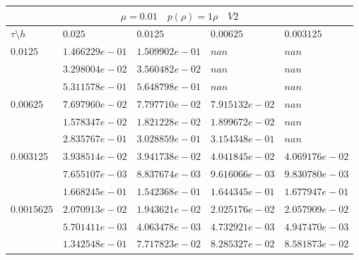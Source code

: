 \documentclass[a4paper,12pt]{extarticle}
\begin{document}
\begin{tabular}{|l|l|l|l|l|}
	\hline
	\multicolumn{5}{|c|}{$\mu =0.01 \quad  p(\rho) =1 \rho \quad V2$}\\
	\hline
	$\tau\setminus h$ & $0.025$ & $0.0125$ & $0.00625$ & $0.003125$\\
	\hline
	$0.0125$  & $1.466229e-01$ & $1.509902e-01$ & $nan$ & $nan$\\
	& $3.298004e-02$ & $3.560482e-02$ & $nan$ & $nan$\\
	& $5.311578e-01$ & $5.648798e-01$ & $nan$ & $nan$\\
	\hline
	$0.00625$  & $7.697960e-02$ & $7.797710e-02$ & $7.915132e-02$ & $nan$\\
	& $1.578347e-02$ & $1.821228e-02$ & $1.899672e-02$ & $nan$\\
	& $2.835767e-01$ & $3.028859e-01$ & $3.154348e-01$ & $nan$\\
	\hline
	$0.003125$  & $3.938514e-02$ & $3.941738e-02$ & $4.041845e-02$ & $4.069176e-02$\\
	& $7.655107e-03$ & $8.837674e-03$ & $9.616066e-03$ & $9.830780e-03$\\
	& $1.668245e-01$ & $1.542368e-01$ & $1.644345e-01$ & $1.677947e-01$\\
	\hline
	$0.0015625$  & $2.070913e-02$ & $1.943621e-02$ & $2.025176e-02$ & $2.057909e-02$\\
	& $5.701411e-03$ & $4.063478e-03$ & $4.732921e-03$ & $4.947470e-03$\\
	& $1.342548e-01$ & $7.717823e-02$ & $8.285327e-02$ & $8.581873e-02$\\
	\hline
\end{tabular}
\end{document}
